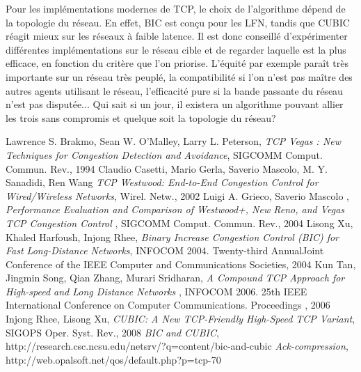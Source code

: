 \documentclass[	DIV=calc,%
							paper=a4,%
							fontsize=11pt,%
							twocolumn]{scrartcl}	 					%
\begin{document}
Pour les implémentations modernes de TCP, le choix de l'algorithme dépend de la topologie du réseau. En effet, BIC est conçu pour les LFN, tandis que CUBIC réagit mieux sur les réseaux à faible latence. Il est donc conseillé d'expérimenter différentes implémentations sur le réseau cible et de regarder laquelle est la plus efficace, en fonction du critère que l'on priorise. L'équité par exemple paraît très importante sur un réseau très peuplé, la compatibilité si l'on n'est pas maître des autres agents utilisant le réseau, l'efficacité pure si la bande passante du réseau n'est pas disputée... Qui sait si un jour, il existera un algorithme pouvant allier les trois sans compromis et quelque soit la topologie du réseau?
\begin{thebibliography}{9}

\tiny{
	Lawrence S. Brakmo, Sean W. O’Malley, Larry L. Peterson,
	\emph{TCP Vegas : New Techniques for Congestion Detection and Avoidance},
	SIGCOMM Comput. Commun. Rev.,
	1994
	Claudio Casetti, Mario Gerla, Saverio Mascolo, M. Y. Sanadidi, Ren Wang
	\emph{TCP Westwood: End-to-End Congestion Control for Wired/Wireless Networks},
	Wirel. Netw.,
	2002
	Luigi A. Grieco, Saverio Mascolo ,
	\emph{Performance Evaluation and Comparison of Westwood+, New Reno, and Vegas TCP Congestion Control },
	SIGCOMM Comput. Commun. Rev.,
	2004
	Lisong Xu, Khaled Harfoush, Injong Rhee,
	\emph{ Binary Increase Congestion Control (BIC) for Fast Long-Distance Networks},
	INFOCOM 2004. Twenty-third AnnualJoint Conference of the IEEE Computer and Communications Societies,
	2004
	Kun Tan, Jingmin Song, Qian Zhang, Murari Sridharan,
	\emph{A Compound TCP Approach for High-speed and Long Distance Networks },
	INFOCOM 2006. 25th IEEE International Conference on Computer Communications. Proceedings		,
	2006
	Injong Rhee, Lisong Xu,
	\emph{CUBIC: A New TCP-Friendly High-Speed TCP Variant},
	SIGOPS Oper. Syst. Rev.,
	2008
	\emph{BIC and CUBIC},
	http://research.csc.ncsu.edu/netsrv/?q=content/bic-and-cubic
	\emph{Ack-compression},
	http://web.opalsoft.net/qos/default.php?p=tcp-70

}

\end{thebibliography}
\end{document}
